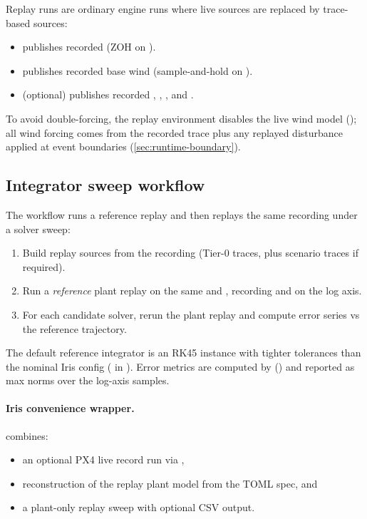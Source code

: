 Replay runs are ordinary engine runs where live sources are replaced by trace-based sources:
\begin{itemize}[leftmargin=*,itemsep=2pt]
  \item {} publishes recorded  (ZOH on ).
  \item {} publishes recorded base wind (sample-and-hold on ).
  \item {} (optional) publishes recorded , , , and .
\end{itemize}
To avoid double-forcing, the replay environment disables the live wind model (); all wind forcing comes from the recorded trace plus any replayed disturbance applied at event boundaries (\cref{sec:runtime-boundary}).

\subsection{Integrator sweep workflow}
\label{sec:integrator-sweep}

The workflow  runs a reference replay and then replays the same recording under a solver sweep:\vspace{-2pt}
\begin{enumerate}[leftmargin=*,itemsep=2pt]
  \item Build replay sources from the recording (Tier-0 traces, plus scenario traces if required).
  \item Run a \emph{reference} plant replay on the same  and , recording  and  on the log axis.
  \item For each candidate solver, rerun the plant replay and compute error series vs the reference trajectory.
\end{enumerate}
The default reference integrator is an RK45 instance with tighter tolerances than the nominal Iris config ( in ). Error metrics are computed by  () and reported as max norms over the log-axis samples.

\paragraph{Iris convenience wrapper.}
 combines:
\begin{itemize}[leftmargin=*,itemsep=2pt]
  \item an optional PX4 live record run via ,
  \item reconstruction of the replay plant model from the TOML spec, and
  \item a plant-only replay sweep with optional CSV output.
\end{itemize}

